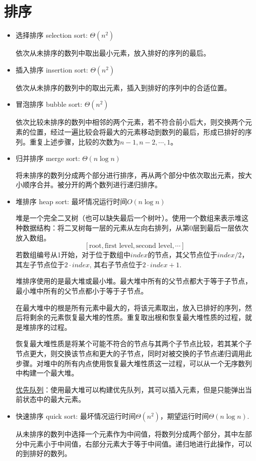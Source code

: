 \section{排序}
\begin{itemize}
    \item 选择排序 selection sort: $\Theta (n^2)$

    依次从未排序的数列中取出最小元素，放入排好的序列的最后。

    \item 插入排序 insertion sort: $\Theta (n^2)$

    依次从未排序的数列中的取出元素，插入到排好的序列中的合适位置。

    \item 冒泡排序 bubble sort: $\Theta (n^2)$

    依次比较未排序的数列中相邻的两个元素，若不符合前小后大，则交换两个元素的位置，经过一遍比较会将最大的元素移动到数列的最后，形成已排好的序列。重复上述步骤，比较的次数为$n-1, n-2, \cdots, 1$。

    \item 归并排序 merge sort: $\Theta (n \log n)$

    将未排序的数列分成两个部分进行排序，再从两个部分中依次取出元素，按大小顺序合并。被分开的两个数列进行递归排序。

    \item 堆排序 heap sort: 最坏情况运行时间$O (n \log n)$

    堆是一个完全二叉树（也可以缺失最后一个树叶）。使用一个数组来表示堆这种数据结构：将二叉树每一层的元素从左向右排列，从第0层到最后一层依次放入数组。
    \[ [ \text{root}, \text{first level}, \text{second level}, \cdots ]\]
    若数组编号从1开始，对于位于数组中$index$的节点，其父节点位于$index / 2$，其左子节点位于$2 \cdot index$, 其右子节点位于$2 \cdot index + 1$.

    堆排序使用的是最大堆或最小堆。最大堆中所有的父节点都大于等于子节点，最小堆中所有的父节点都小于等于子节点。

    在最大堆中的根是所有元素中最大的，将该元素取出，放入已排好的序列，然后将剩余的元素恢复最大堆的性质。重复取出根和恢复最大堆性质的过程，就是堆排序的过程。

    恢复最大堆性质是将某个可能不符合的节点与其两个子节点比较，若其某个子节点更大，则交换该节点和更大的子节点，同时对被交换的子节点递归调用此步骤。对堆中的所有内点使用恢复最大堆性质这一过程，可以从一个无序数列中构建一个最大堆。

    \uline{优先队列}：使用最大堆可以构建优先队列，其可以插入元素，但是只能弹出当前状态中的最大元素。

    \item 快速排序 quick sort: 最坏情况运行时间$\Theta (n^2)$，期望运行时间$\Theta (n \log n)$.

    从未排序的数列中选择一个元素作为中间值，将数列分成两个部分，其中左部分中元素小于中间值，右部分元素大于等于中间值。递归地进行此操作，可以的到排好的数列。
\end{itemize}

